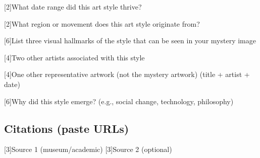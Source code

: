 \documentclass[12pt]{article}
\makeatletter
\newcounter{question}
\newlength\questionheight
\newcommand{\question}{\@ifstar{\question@text}{\question@field}}
\newcommand{\question@heading}[1]{%
  \refstepcounter{question}%
  \vspace{0.3cm}%
  \noindent\textbf{\faEdit\ Question \thequestion: #1}%
}
\newcommand{\question@text}[1]{%
  \question@heading{#1}%
}
\newcommand{\question@field}[2][\questionheight]{%
  \question@heading{#2}%
 \\[0.3em] \begin{Form}
    \TextField[
      name=Q\thequestion,
      multiline=true,
      width=\linewidth,
      height=#1,
      charsize=10pt,
      bordercolor={0 0 0},
      borderwidth=1.8,
      backgroundcolor={1 1 1}
    ]{}
  \end{Form}
  \vspace{0.3cm}%
}
\makeatother
\begin{document}
\question[2\baselineskip]{What date range did this art style thrive?}

\question[2\baselineskip]{What region or movement does this art style originate from?}

\question[6\baselineskip]{List three visual hallmarks of the style that can be seen in your mystery image}

\question[4\baselineskip]{Two other artists associated with this style}

\question[4\baselineskip]{One other representative artwork (not the mystery artwork) (title + artist + date)}

\question[6\baselineskip]{Why did this style emerge? (e.g., social change, technology, philosophy)}

\subsection*{Citations (paste URLs)}
\question[3\baselineskip]{Source 1 (museum/academic)}
\question[3\baselineskip]{Source 2 (optional)}
\end{document}
